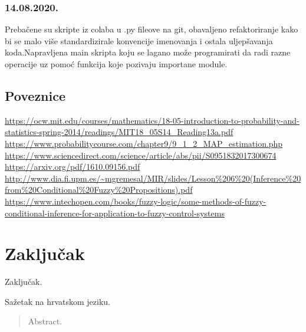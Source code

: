 \documentclass[times, utf8,projekt]{fer}
\begin{document}
		\subsection{14.08.2020.}
			Prebačene su skripte iz colaba u .py fileove na git, obavaljeno refaktoriranje kako bi se malo više standardizirale konvencije imenovanja i ostala uljepšavanja koda.Napravljena main skripta koju se lagano može programirati da radi razne operacije uz pomoć funkcija koje pozivaju importane module.
	\section{Poveznice}
	\url{https://ocw.mit.edu/courses/mathematics/18-05-introduction-to-probability-and-statistics-spring-2014/readings/MIT18_05S14_Reading13a.pdf}\newline
	\url{https://www.probabilitycourse.com/chapter9/9_1_2_MAP_estimation.php}\newline
	\url{https://www.sciencedirect.com/science/article/abs/pii/S0951832017300674}\newline
	\url{https://arxiv.org/pdf/1610.09156.pdf}\newline
	\url{http://www.dia.fi.upm.es/~mgremesal/MIR/slides/Lesson\%206\%20(Inference\%20from\%20Conditional\%20Fuzzy\%20Propositions).pdf}\newline
	\url{https://www.intechopen.com/books/fuzzy-logic/some-methods-of-fuzzy-conditional-inference-for-application-to-fuzzy-control-systems}
\chapter{Zaključak}
Zaključak.



\begin{sazetak}
Sažetak na hrvatskom jeziku.

\end{sazetak}

\begin{abstract}
Abstract.

\end{abstract}
\end{document}
